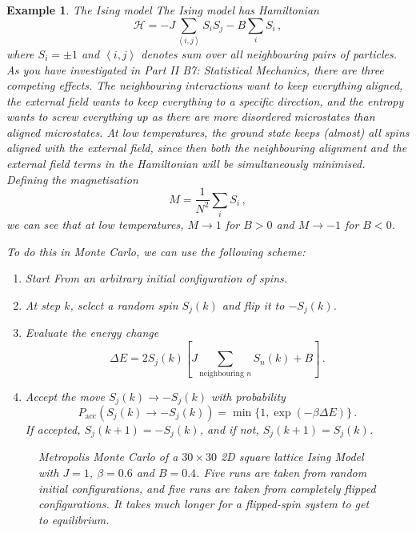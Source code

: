 \documentclass{article}
\theoremstyle{plain}\theoremheaderfont{\normalfont\itshape}\theorembodyfont{\rmfamily}\theoremseparator{.}\newtheorem*{rem}{Remark}\newtheorem*{ex}{Example}\newtheorem*{proof}{Proof}\newtheorem*{altp}{Alternative proof}
\theoremstyle{plain}\theoremheaderfont{\normalfont\bfseries}\theorembodyfont{\rmfamily}\theoremseparator{.}\newtheorem{thm}{Theorem}[section]\newtheorem{lem}[thm]{Lemma}\newtheorem{prop}[thm]{Proposition}\newtheorem*{cor}{Corollary}\newtheorem{defn}[thm]{Definition}\newtheorem{clm}[thm]{Claim}\newtheorem{clminproof}{Claim}\newtheorem{alg}[thm]{Algorithm}\newtheorem{hyp}[thm]{Hypothesis}\newtheorem{law}[thm]{Law}
\theoremstyle{break}\theoremheaderfont{\normalfont\itshape}\theorembodyfont{\rmfamily}\theoremseparator{.\medskip}\newtheorem*{proofskip}{Proof}\newtheorem*{exs}{Examples}\newtheorem*{rems}{Remarks}
\theoremstyle{break}\theoremheaderfont{\normalfont\bfseries}\theorembodyfont{\rmfamily}\theoremseparator{.\medskip}\newtheorem{lemskip}[thm]{Lemma}\newtheorem{defnskip}[thm]{Definition}\newtheorem{propskip}[thm]{Proposition}\newtheorem{thmskip}[thm]{Theorem}
\numberwithin{equation}{section}
\newcommand{\eval}[1]{\left\langle #1 \right\rangle}
\begin{document}
    \begin{ex}
        \textit{The Ising model}
        The Ising model has Hamiltonian
        \begin{equation}
            \mathcal{H}=-J\sum_{\eval{i,j}}S_iS_j-B\sum_i S_i\,,
        \end{equation}
        where \(S_i=\pm 1\) and \(\eval{i,j}\) denotes sum over all neighbouring pairs of particles. As you have investigated in Part II B7: \textit{Statistical Mechanics}, there are three competing effects. The neighbouring interactions want to keep everything aligned, the external field wants to keep everything to a specific direction, and the entropy wants to screw everything up as there are more disordered microstates than aligned microstates. At low temperatures, the ground state keeps (almost) all spins aligned with the external field, since then both the neighbouring alignment and the external field terms in the Hamiltonian will be simultaneously minimised. Defining the magnetisation
        \begin{equation}
            M=\frac{1}{N^2}\sum_i S_i\,,
        \end{equation}
        we can see that at low temperatures, \(M\to 1\) for \(B>0\) and \(M\to -1\) for \(B<0\).

        To do this in Monte Carlo, we can use the following scheme:
        \begin{enumerate}
            \item Start From an arbitrary initial configuration of spins.
            \item At step \(k\), select a random spin \(S_j(k)\) and flip it to \(-S_j(k)\).
            \item Evaluate the energy change
            \begin{equation}
                \Delta E=2S_j(k)\left[J\sum_{\text{neighbouring }n}S_n(k)+B\right]\,.
            \end{equation}
            \item Accept the move \(S_j(k)\to -S_j(k)\) with probability
            \begin{equation}
                P_{\text{acc}}(S_j(k)\to -S_j(k))=\min\{1,\exp(-\beta \Delta E)\}\,.
            \end{equation}
            If accepted, \(S_j(k+1)=-S_j(k)\), and if not, \(S_j(k+1)=S_j(k)\).
        \end{enumerate}

        \begin{figure}
            \centering
            
            \caption{Metropolis Monte Carlo of a \(30\times 30\) 2D square lattice Ising Model with \(J=1\), \(\beta=0.6\) and \(B=0.4\). Five runs are taken from random initial configurations, and five runs are taken from completely flipped configurations. It takes much longer for a flipped-spin system to get to equilibrium.}
        \end{figure}
    \end{ex}
\end{document}
